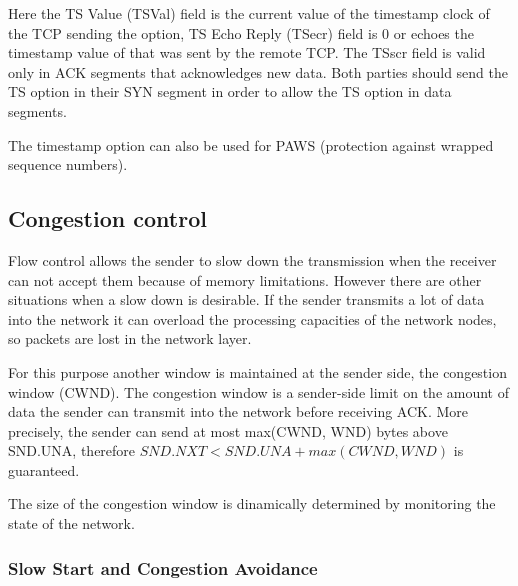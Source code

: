 Here the TS Value (TSVal) field is the current value of the timestamp
clock of the TCP sending the option, TS Echo Reply (TSecr) field is
0 or echoes the timestamp value of that was sent by the remote TCP.
The TSscr field is valid only in ACK segments that acknowledges new
data. Both parties should send the TS option in their SYN segment
in order to allow the TS option in data segments.

The timestamp option can also be used for PAWS (protection against wrapped
sequence numbers).


\subsection{Congestion control}

Flow control allows the sender to slow down the transmission when the
receiver can not accept them because of memory limitations. However
there are other situations when a slow down is desirable. If the sender
transmits a lot of data into the network it can overload the processing
capacities of the network nodes, so packets are lost in the network
layer.

For this purpose another window is maintained at the sender side, the
congestion window (CWND). The congestion window is a sender-side limit
on the amount of data the sender can transmit into the network before
receiving ACK. More precisely, the sender can send at most max(CWND, WND)
bytes above SND.UNA, therefore $ SND.NXT < SND.UNA + max(CWND, WND) $ is
guaranteed.

The size of the congestion window is dinamically determined by monitoring
the state of the network.

%
%


\subsubsection*{Slow Start and Congestion Avoidance}

